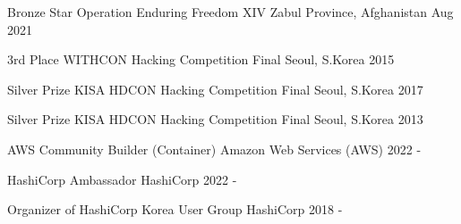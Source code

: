 \begin{cvhonors}

  \cvhonor
    {Bronze Star} %
    {Operation Enduring Freedom XIV} %
    {Zabul Province, Afghanistan} %
    {Aug 2021} %

  \cvhonor
    {3rd Place} %
    {WITHCON Hacking Competition Final} %
    {Seoul, S.Korea} %
    {2015} %

  \cvhonor
    {Silver Prize} %
    {KISA HDCON Hacking Competition Final} %
    {Seoul, S.Korea} %
    {2017} %

  \cvhonor
    {Silver Prize} %
    {KISA HDCON Hacking Competition Final} %
    {Seoul, S.Korea} %
    {2013} %

\end{cvhonors}



\begin{cvhonors}

  \cvhonor
    {AWS Community Builder (Container)} %
    {Amazon Web Services (AWS)} %
    {} %
    {2022 - } %

  \cvhonor
    {HashiCorp Ambassador} %
    {HashiCorp} %
    {} %
    {2022 - } %

  \cvhonor
    {Organizer of HashiCorp Korea User Group} %
    {HashiCorp} %
    {} %
    {2018 - } %

\end{cvhonors}
